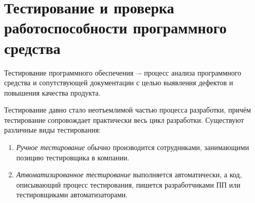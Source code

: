 \section{Тестирование и проверка работоспособности программного средства}
\label{sec:testing}

Тестирование программного обеспечения –- процесс анализа программного средства и сопутствующей документации с целью выявления дефектов и повышения качества продукта. \cite{kulikov_testing}

Тестирование давно стало неотъемлимой частью процесса разработки, причём тестирование сопровождает практически весь цикл разработки. Существуют различные виды тестирования:
\begin{enumerate}
	\item \textit{Ручное тестирование} обычно производится сотрудниками, занимающими позицию тестировщика в компании.
	\item \textit{Атвоматизированное тестирование} выполняется автоматически, а код, описывающий процесс тестирования, пишется разработчиками ПП или тестировщиками автоматизаторами.
\end{enumerate}